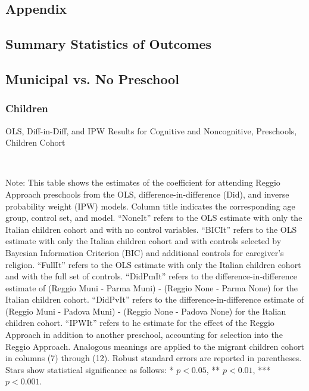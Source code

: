 \begin{landscape}
\section{Appendix}
\subsection{Summary Statistics of Outcomes}

\end{landscape}

\begin{landscape}
\subsection{Municipal vs. No Preschool}\label{appendix:no-preschool}
\subsubsection{Children}
\begin{table}[H] \caption{OLS, Diff-in-Diff, and IPW Results for Cognitive and Noncognitive, Preschools, Children Cohort} \label{ols-E-reg}
\scalebox{0.80}{}
\vspace{1ex} \\
\footnotesize\raggedright{Note: This table shows the estimates of the coefficient for attending Reggio Approach preschools from the OLS, difference-in-difference (Did), and inverse probability weight (IPW) models. Column title indicates the corresponding age group, control set, and model. ``NoneIt'' refers to the OLS estimate with only the Italian children cohort and with no control variables. ``BICIt'' refers to the OLS estimate with only the Italian children cohort and with controls selected by Bayesian Information Criterion (BIC) and additional controls for caregiver's religion. ``FullIt'' refers to the OLS estimate with only the Italian children cohort and with the full set of controls. ``DidPmIt'' refers to the difference-in-difference estimate of (Reggio Muni - Parma Muni) - (Reggio None - Parma None) for the Italian children cohort. ``DidPvIt'' refers to the difference-in-difference estimate of (Reggio Muni - Padova Muni) - (Reggio None - Padova None) for the Italian children cohort. ``IPWIt'' refers to he estimate for the effect of the Reggio Approach in addition to another preschool, accounting for selection into the Reggio Approach. Analogous meanings are applied to the migrant children cohort in columns (7) through (12). Robust standard errors are reported in parentheses. Stars show statistical significance as follows: * $p < 0.05$, ** $p < 0.01$, *** $p < 0.001$.}
\end{table}


\end{landscape}
